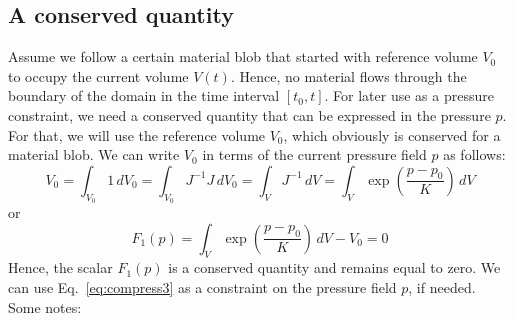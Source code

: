 \subsection{A conserved quantity}
Assume we follow a certain material blob that started with reference volume $V_0$ to occupy the current volume $V(t)$. Hence, no material flows through the boundary of the domain in the time interval $[t_0,t]$. For later use as a pressure constraint, we need a conserved quantity that can be expressed in the pressure $p$. For that, we will use the reference volume $V_0$, which obviously is conserved for a material blob. We can write $V_0$ in terms of the current pressure field $p$ as follows:
\[
   V_0=\int_{V_0}1\,dV_0=\int_{V_0}J^{-1}J\,dV_0=\int_{V}J^{-1}\,dV=\int_{V}\exp(\frac{p-p_0}{K})\,dV
\]
or
\begin{equation}
  F_1(p)=\int_{V}\exp(\frac{p-p_0}{K})\,dV-V_0=0
  \label{eq:compress3}
\end{equation}
Hence, the scalar $F_1(p)$ is a conserved quantity and remains equal to zero. We can use Eq.~\eqref{eq:compress3} as a constraint on the pressure field $p$, if needed.
Some notes:
